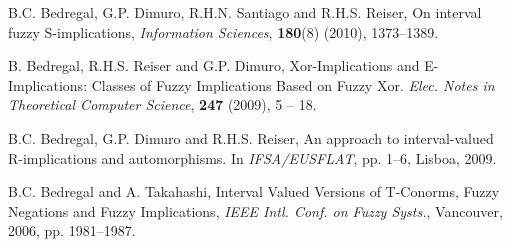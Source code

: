 \documentclass[12pt]{article}
\theoremstyle{plain}
\theoremstyle{remark}
\theoremstyle{definition}
\theoremstyle{proposition}
\begin{document}
\begin{thebibliography}{8}
{%

B.C. Bedregal, G.P. Dimuro, R.H.N. Santiago and R.H.S. Reiser, On
interval fuzzy {S}-implications, \emph{Information Sciences},
\textbf{180}(8) (2010), 1373--1389.

 B. Bedregal, R.H.S. Reiser and G.P. Dimuro,
Xor-Implications and E-Implications: Classes of Fuzzy Implications
Based on Fuzzy Xor. \emph{Elec. Notes in Theoretical Computer
Science}, {\bf 247} (2009), 5 -- 18.


 B.C. Bedregal, G.P. Dimuro and R.H.S. Reiser, An
approach to interval-valued R-implications and automorphisms. In
\emph{IFSA/EUSFLAT}, pp. 1--6, Lisboa, 2009.


 B.C. Bedregal and A. Takahashi,
Interval Valued Versions of T-Conorms, Fuzzy Negations and Fuzzy
Implications, \emph{IEEE Intl. Conf. on Fuzzy Systs.}, Vancouver,
2006, pp. 1981--1987.





}
\end{thebibliography}
\end{document}
